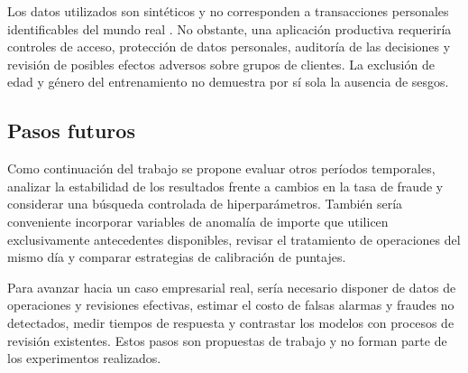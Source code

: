 Los datos utilizados son sintéticos y no corresponden a transacciones personales identificables del mundo real \cite{inproceedings}. No obstante, una aplicación productiva requeriría controles de acceso, protección de datos personales, auditoría de las decisiones y revisión de posibles efectos adversos sobre grupos de clientes. La exclusión de edad y género del entrenamiento no demuestra por sí sola la ausencia de sesgos.

\subsection{Pasos futuros}
Como continuación del trabajo se propone evaluar otros períodos temporales, analizar la estabilidad de los resultados frente a cambios en la tasa de fraude y considerar una búsqueda controlada de hiperparámetros. También sería conveniente incorporar variables de anomalía de importe que utilicen exclusivamente antecedentes disponibles, revisar el tratamiento de operaciones del mismo día y comparar estrategias de calibración de puntajes.

Para avanzar hacia un caso empresarial real, sería necesario disponer de datos de operaciones y revisiones efectivas, estimar el costo de falsas alarmas y fraudes no detectados, medir tiempos de respuesta y contrastar los modelos con procesos de revisión existentes. Estos pasos son propuestas de trabajo y no forman parte de los experimentos realizados.
